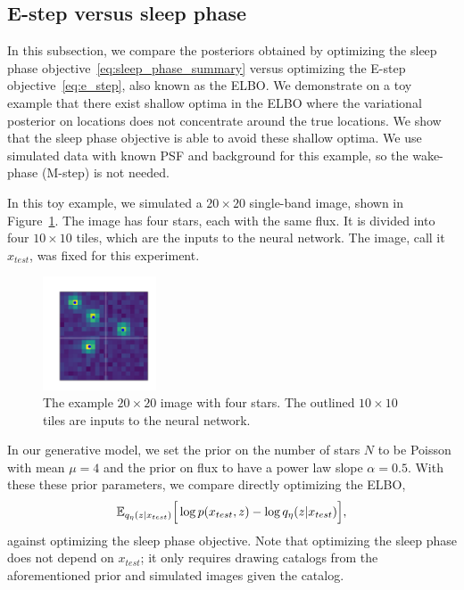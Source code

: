 \subsection{E-step versus sleep phase}
\label{sec:estep_sleep_compare}

In this subsection, we compare the posteriors obtained by optimizing the sleep phase objective~\eqref{eq:sleep_phase_summary} 
versus optimizing the E-step objective~\eqref{eq:e_step}, also known as the ELBO. 
We demonstrate on a toy example that there exist shallow optima in the ELBO where the variational posterior on locations does not concentrate around the true locations.
We show that the sleep phase objective is able to avoid these shallow optima. 
We use simulated data with known PSF and background for this example, so the wake-phase (M-step) is not needed. 

In this toy example, we simulated a $20\times20$ single-band image, shown in Figure~\ref{fig:toy_example}.
The image has four stars, each with the same flux. It is divided into four $10\times 10$ tiles, which are the inputs to the neural network. The image, call it $x_{test}$, was fixed for this experiment. 

\begin{figure}[!h]
    \centering
    \vspace{-1em}
    \includegraphics[width = 0.3\textwidth]{figures/vi_sleep_ex_figure.png}
    \vspace{-1.7em}
    \caption{The example $20\times 20$ image with four stars. The outlined $10\times 10$ tiles are inputs to the neural network. }
    \label{fig:toy_example}
\end{figure}

In our generative model, we set the prior on the number of stars $N$ to be Poisson with mean $\mu = 4$ and the prior on flux to have a power law slope $\alpha = 0.5$. 
With these these prior parameters, we compare directly optimizing the ELBO, 
\begin{align}
\mathbb{E}_{q_{\eta}(z | x_{test})}\Big[\log p(x_{test}, z) - \log q_{\eta}(z | x_{test})\Big],
\label{eq:elbo_on_test}
\end{align}
against optimizing the sleep phase objective. Note that optimizing the sleep phase does not depend on $x_{test}$; it only requires drawing catalogs from the aforementioned prior and simulated images given the catalog. 


